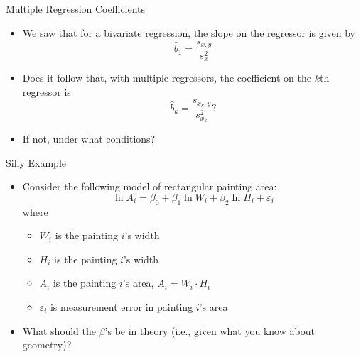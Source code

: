 \documentclass[aspectratio=169,11pt]{beamer}
\begin{document}


\begin{frame}{Multiple Regression Coefficients}
	\begin{itemize}
\item We saw that for a bivariate regression, the slope on the regressor is given by
\[
\hat{b}_1 =\frac{s_{x,y}}{s_{x}^{2}} 
\]

\medskip
\item Does it follow that, with multiple regressors, the coefficient on the $k$th regressor is
\[
\hat{b}_k =\frac{s_{x_{k},y}}{s_{x_{k}}^{2}} ?
\]

\medskip
\item If not, under what conditions?

\end{itemize}
\end{frame}


\begin{frame}{Silly Example}
	\begin{itemize}
	\item Consider the following model of rectangular painting area:\[
	\ln A_{i} = \beta_0 + \beta_{1} \ln W_{i} + \beta_{2} \ln H_{i} + \varepsilon_{i}
	\]
	where 
	\begin{itemize}
		\item $W_{i}$ is the painting $i$'s width
		\item $H_{i}$ is the painting $i$'s width
		\item $A_{i}$ is the painting $i$'s area, $A_{i} =W_{i} \cdot H_{i} $
		\item $\varepsilon_i$ is measurement error in painting $i$'s area
	\end{itemize}

	\medskip
	\item What should the $\beta$'s be in theory (i.e., given what you know about geometry)?
\end{itemize}
\end{frame}
\end{document}
